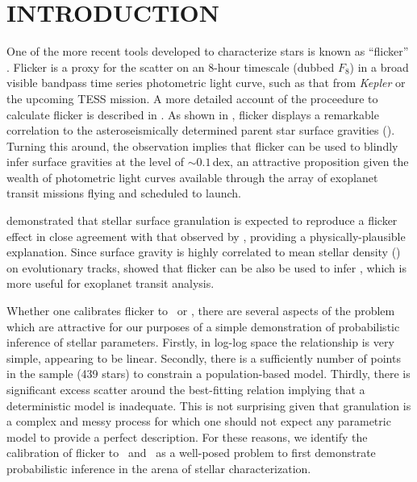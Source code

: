 \documentclass[apjl]{emulateapj}
\begin{document}

\section{INTRODUCTION}
\label{sec:intro}



One of the more recent tools developed to characterize stars is known as
``flicker'' \citep{bastien:2013}. Flicker is a proxy for the scatter on an
8-hour timescale (dubbed $F_8$) in a broad visible bandpass time series
photometric light curve, such as that from \textit{Kepler} or the upcoming TESS
mission. A more detailed account of the proceedure to calculate flicker is
described in \citet{bastien:2013}. As shown in \citet{bastien:2013}, flicker
displays a remarkable correlation to the asteroseismically determined parent
star surface gravities (\logg). Turning this around, the observation implies
that flicker can be used to blindly infer surface gravities at the level of
$\sim0.1$\,dex, an attractive proposition given the wealth of photometric light
curves available through the array of exoplanet transit missions flying and
scheduled to launch.

\citet{cranmer:2014} demonstrated that stellar surface granulation is expected
to reproduce a flicker effect in close agreement with that observed by
\citet{bastien:2013}, providing a physically-plausible explanation. Since
surface gravity is highly correlated to mean stellar density (\rhostar) on
evolutionary tracks, \citet{kipping:2014} showed that flicker can be also
be used to infer \rhostar, which is more useful for exoplanet transit
analysis.

Whether one calibrates flicker to \logg\ or \rhostar, there are several aspects
of the problem which are attractive for our purposes of a simple demonstration
of probabilistic inference of stellar parameters. Firstly, in log-log space the
relationship is very simple, appearing to be linear. Secondly, there is a
sufficiently number of points in the sample (439 stars) to constrain a
population-based model. Thirdly, there is significant excess scatter around the
best-fitting relation implying that a deterministic model is inadequate. This is
not surprising given that granulation is a complex and messy process for which
one should not expect any parametric model to provide a perfect description. For
these reasons, we identify the calibration of flicker to \logg\ and \rhostar\
as a well-posed problem to first demonstrate probabilistic inference in the
arena of stellar characterization.
\end{document}
